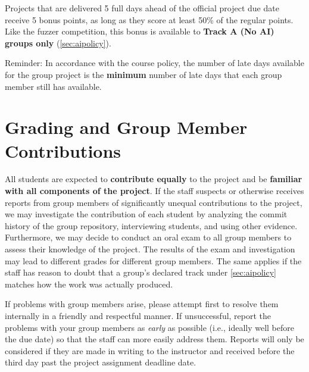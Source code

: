 \documentclass[letterpaper,11pt]{article}
\begin{document}
\squishend


Projects that are delivered 5 full days ahead of the official project due date receive 5 bonus points, as long as they score at least 50\% of the regular points. Like the fuzzer competition, this bonus is available to \textbf{Track A (No AI) groups only} (\autoref{sec:aipolicy}).

Reminder: In accordance with the course policy, the number of late days
available for the group project is the \textbf{minimum} number of late days that
each group member still has available.


\section{Grading and Group Member Contributions}
\label{sec:grading}

All students are expected to \textbf{contribute equally} to the project and be \textbf{familiar
with all components of the project}. If the staff suspects or otherwise receives
reports from group members of significantly unequal contributions to the project,
we may investigate the contribution of each student by analyzing the commit
history of the group repository, interviewing students, and using other evidence.
Furthermore, we may decide to conduct an oral exam to all group members to
assess their knowledge of the project. The results of the exam and investigation
may lead to different grades for different group members. The same applies if
the staff has reason to doubt that a group's declared track under
\autoref{sec:aipolicy} matches how the work was actually produced.

If problems with group members arise, please attempt first to resolve them
internally in a friendly and respectful manner. If unsuccessful, report the
problems with your group members as \textit{early} as possible (i.e., ideally
well before the due date) so that the staff can more easily address them.
Reports will only be considered if they are made in writing to the instructor
and received before the third day past the project assignment deadline date.
\end{document}
